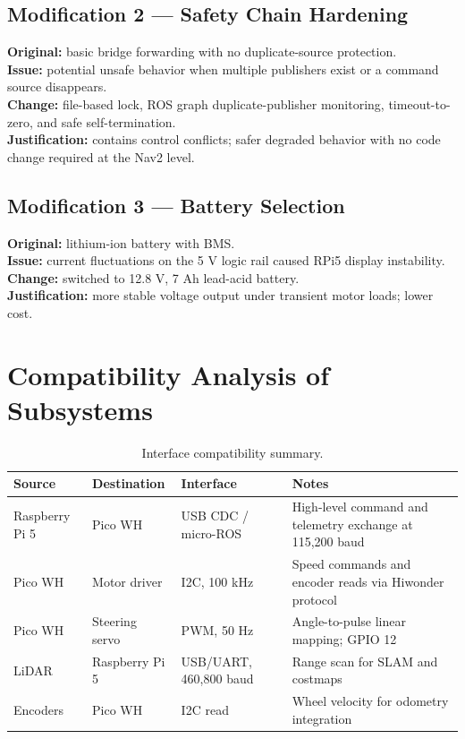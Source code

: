\documentclass[12pt,a4paper]{report}
\begin{document}
\subsection{Modification 2 --- Safety Chain Hardening}
\textbf{Original:} basic bridge forwarding with no duplicate-source protection.\\
\textbf{Issue:} potential unsafe behavior when multiple publishers exist or a command source disappears.\\
\textbf{Change:} file-based lock, ROS graph duplicate-publisher monitoring, timeout-to-zero, and safe self-termination.\\
\textbf{Justification:} contains control conflicts; safer degraded behavior with no code change required at the Nav2 level.

\subsection{Modification 3 --- Battery Selection}
\textbf{Original:} lithium-ion battery with BMS.\\
\textbf{Issue:} current fluctuations on the 5 V logic rail caused RPi5 display instability.\\
\textbf{Change:} switched to 12.8 V, 7 Ah lead-acid battery.\\
\textbf{Justification:} more stable voltage output under transient motor loads; lower cost.

\section{Compatibility Analysis of Subsystems}

\begin{table}[H]
\centering
\caption{Interface compatibility summary.}
\label{tab:compat}
\begin{tabularx}{\textwidth}{|p{2.8cm}|p{2.8cm}|p{2.4cm}|X|}
\hline
\textbf{Source} & \textbf{Destination} & \textbf{Interface} & \textbf{Notes} \\
\hline
Raspberry Pi 5 & Pico WH & USB CDC / micro-ROS & High-level command and telemetry exchange at 115,200 baud \\
\hline
Pico WH & Motor driver & I2C, 100 kHz & Speed commands and encoder reads via Hiwonder protocol \\
\hline
Pico WH & Steering servo & PWM, 50 Hz & Angle-to-pulse linear mapping; GPIO 12 \\
\hline
LiDAR & Raspberry Pi 5 & USB/UART, 460,800 baud & Range scan for SLAM and costmaps \\
\hline
Encoders & Pico WH & I2C read & Wheel velocity for odometry integration \\
\hline
\end{tabularx}
\end{table}
\end{document}
